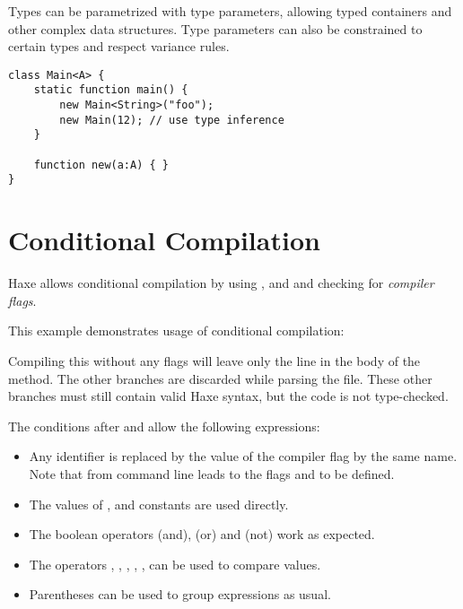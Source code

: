 Types can be parametrized with type parameters, allowing typed containers and other complex data structures. Type parameters can also be constrained to certain types and respect variance rules.

\begin{lstlisting}
class Main<A> {
    static function main() {
        new Main<String>("foo");
        new Main(12); // use type inference
    }

    function new(a:A) { }
}
\end{lstlisting}

\section{Conditional Compilation}
\label{lf-condition-compilation}

Haxe allows conditional compilation by using ,  and  and checking for \emph{compiler flags}.


This example demonstrates usage of conditional compilation:


Compiling this without any flags will leave only the  line in the body of the  method. The other branches are discarded while parsing the file. These other branches must still contain valid Haxe syntax, but the code is not type-checked.

The conditions after  and  allow the following expressions:

\begin{itemize}
	\item Any identifier is replaced by the value of the compiler flag by the same name. Note that  from command line leads to the flags  and  to be defined.
	\item The values of ,  and  constants are used directly.
	\item The boolean operators \expr{\&\&} (and), \expr{||} (or) and \expr{!} (not) work as expected.
	\item The operators \expr{==}, \expr{!=}, \expr{>}, \expr{>=}, \expr{<}, \expr{<=} can be used to compare values.
	\item Parentheses \expr{()} can be used to group expressions as usual.
\end{itemize}

